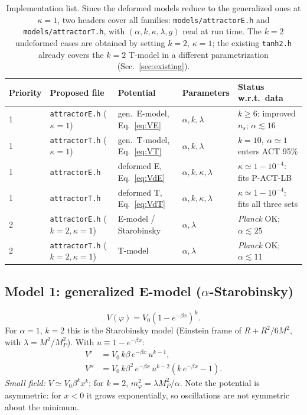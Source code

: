 \documentclass[11pt,a4paper]{article}
\newcommand{\MP}{M_P}
\newcommand{\aatt}{\alpha}
\begin{document}
\begin{table}[h!]
\centering
\renewcommand{\arraystretch}{1.25}
\small
\begin{tabular}{@{}l l l l l@{}}
\toprule
Priority & Proposed file & Potential & Parameters & Status w.r.t.\ data \\
\midrule
1 & \texttt{attractorE.h} ($\kappa=1$)   & gen.\ E-model, Eq.~\eqref{eq:VE}   & $\aatt,k,\lambda$ & $k\ge 6$: improved $n_s$; $\aatt\lesssim 16$ \\
1 & \texttt{attractorT.h} ($\kappa=1$)   & gen.\ T-model, Eq.~\eqref{eq:VT}   & $\aatt,k,\lambda$ & $k=10,\ \aatt\simeq 1$ enters ACT 95\% \\
1 & \texttt{attractorE.h}                & deformed E, Eq.~\eqref{eq:VdE}     & $\aatt,k,\kappa,\lambda$ & $\kappa\simeq1-10^{-4}$: fits P-ACT-LB \\
1 & \texttt{attractorT.h}                & deformed T, Eq.~\eqref{eq:VdT}     & $\aatt,k,\kappa,\lambda$ & $\kappa\simeq1-10^{-4}$: fits all three sets \\
2 & \texttt{attractorE.h} ($k=2,\kappa=1$) & E-model / Starobinsky             & $\aatt,\lambda$ & \textit{Planck} OK; $\aatt\lesssim 25$ \\
2 & \texttt{attractorT.h} ($k=2,\kappa=1$) & T-model                           & $\aatt,\lambda$ & \textit{Planck} OK; $\aatt\lesssim 11$ \\
\bottomrule
\end{tabular}
\caption{Implementation list. Since the deformed models reduce to the generalized ones at $\kappa=1$, two headers cover all families: \texttt{models/attractorE.h} and \texttt{models/attractorT.h}, with $(\aatt,k,\kappa,\lambda,g)$ read at run time. The $k=2$ undeformed cases are obtained by setting $k=2$, $\kappa=1$; the existing \texttt{tanh2.h} already covers the $k=2$ T-model in a different parametrization (Sec.~\ref{sec:existing}).}
\label{tab:summary}
\end{table}

\subsection{Model 1: generalized E-model ($\alpha$-Starobinsky)}
\label{sec:E}
\begin{equation}
V(\varphi) = V_0\left(1-e^{-\beta x}\right)^{k}.
\label{eq:VE}
\end{equation}
For $\aatt=1$, $k=2$ this is the Starobinsky model (Einstein frame of $R+R^2/6M^2$, with $\lambda = M^2/\MP^2$). With $u\equiv 1-e^{-\beta x}$:
\begin{align}
V' &= V_0\,k\beta\,e^{-\beta x}\,u^{k-1}, \\
V'' &= V_0\,k\beta^2\,e^{-\beta x}\,u^{k-2}\left(k\,e^{-\beta x}-1\right).
\end{align}
\emph{Small field:} $V\simeq V_0\beta^k x^k$; for $k=2$, $m_\varphi^2 = \lambda\MP^2/\aatt$. Note the potential is asymmetric: for $x<0$ it grows exponentially, so oscillations are not symmetric about the minimum.
\end{document}
